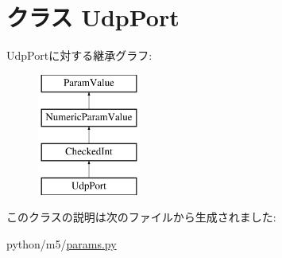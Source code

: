 \hypertarget{classm5_1_1params_1_1UdpPort}{
\section{クラス UdpPort}
\label{classm5_1_1params_1_1UdpPort}
}
UdpPortに対する継承グラフ:\begin{figure}[H]
\begin{center}
\leavevmode
\includegraphics[height=4cm]{classm5_1_1params_1_1UdpPort}
\end{center}
\end{figure}


このクラスの説明は次のファイルから生成されました:\begin{DoxyCompactItemize}
\item 
python/m5/\hyperlink{params_8py}{params.py}\end{DoxyCompactItemize}
